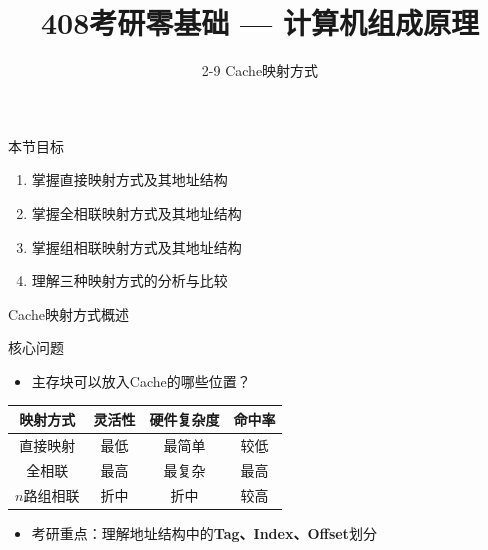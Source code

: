 \documentclass[10pt, aspectratio=169]{beamer}
\title{408考研零基础 --- 计算机组成原理}
\subtitle{2-9 Cache映射方式}
\author{}
\date{}
\begin{document}
\begin{frame}{本节目标}
    \begin{enumerate}
        \item 掌握直接映射方式及其地址结构
        \item 掌握全相联映射方式及其地址结构
        \item 掌握组相联映射方式及其地址结构
        \item 理解三种映射方式的分析与比较
    \end{enumerate}
\end{frame}

\begin{frame}{Cache映射方式概述}
    \begin{block}{核心问题}
        \begin{itemize}
            \item 主存块可以放入Cache的哪些位置？
        \end{itemize}
    \end{block}
    \vspace{0.3em}
    \begin{center}
        \begin{tabular}{|c|c|c|c|}
            \hline
            \textbf{映射方式} & \textbf{灵活性} & \textbf{硬件复杂度} & \textbf{命中率} \\
            \hline
            直接映射 & 最低 & 最简单 & 较低 \\
            \hline
            全相联 & 最高 & 最复杂 & 最高 \\
            \hline
            $n$路组相联 & 折中 & 折中 & 较高 \\
            \hline
        \end{tabular}
    \end{center}
    \vspace{0.5em}
    \begin{itemize}
        \item 考研重点：理解地址结构中的\textbf{Tag、Index、Offset}划分
    \end{itemize}
\end{frame}
\end{document}
